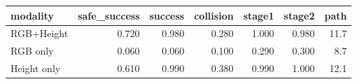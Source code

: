 \begin{tabular}{lrrrrrr}
\toprule
modality & safe_success & success & collision & stage1 & stage2 & path \\
\midrule
RGB+Height & 0.720 & 0.980 & 0.280 & 1.000 & 0.980 & 11.7 \\
RGB only & 0.060 & 0.060 & 0.100 & 0.290 & 0.300 & 8.7 \\
Height only & 0.610 & 0.990 & 0.380 & 0.990 & 1.000 & 12.1 \\
\bottomrule
\end{tabular}
